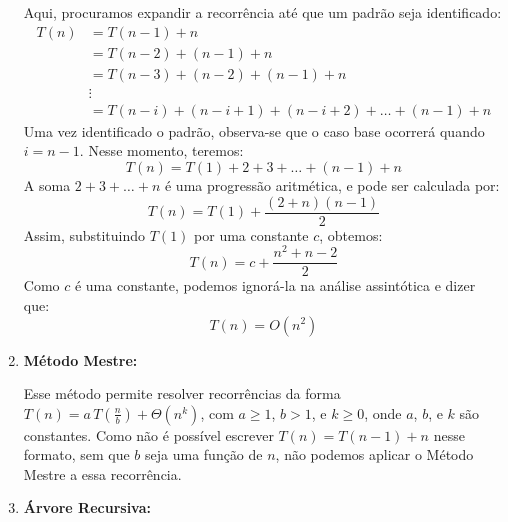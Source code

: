 \begin{enumerate}
	      \vspace{0.4em}
	      Aqui, procuramos expandir a recorrência até que um padrão seja identificado:
	      \begin{align*}
		      T(n) & = T(n-1) + n                                               \\
		           & = T(n-2) + (n - 1) + n                                     \\
		           & = T(n-3) + (n - 2) + (n - 1) + n                           \\
		           & \vdots                                                     \\
		           & = T(n-i) + (n - i + 1) + (n - i + 2) + \dots + (n - 1) + n
	      \end{align*}
	      Uma vez identificado o padrão, observa-se que o caso base ocorrerá quando \( i = n - 1 \). Nesse momento, teremos:
	      \[
		      T(n) = T(1) + 2 + 3 + \dots + (n - 1) + n
	      \]
	      A soma \( 2 + 3 + \dots + n \) é uma progressão aritmética, e pode ser calculada por:
	      \[
		      T(n) = T(1) + \frac{(2 + n)(n - 1)}{2}
	      \]
	      Assim, substituindo \( T(1) \) por uma constante \( c \), obtemos:
	      \[
		      T(n) = c + \frac{n^2 + n - 2}{2}
	      \]
	      Como \( c \) é uma constante, podemos ignorá-la na análise assintótica e dizer que:
	      \[
		      T(n) = O(n^2)
	      \]
	\item \textbf{Método Mestre:}

	      Esse método permite resolver recorrências da forma \( T(n) = a \, T\left(\frac{n}{b}\right) + \Theta(n^k) \), com \( a \geq 1 \), \( b > 1 \), e \( k \geq 0 \), onde \( a \), \( b \), e \( k \) são constantes. Como não é possível escrever \( T(n) = T(n-1) + n \) nesse formato, sem que \( b \) seja uma função de \( n \), não podemos aplicar o Método Mestre a essa recorrência.

	\item \textbf{Árvore Recursiva:}


\end{enumerate}
